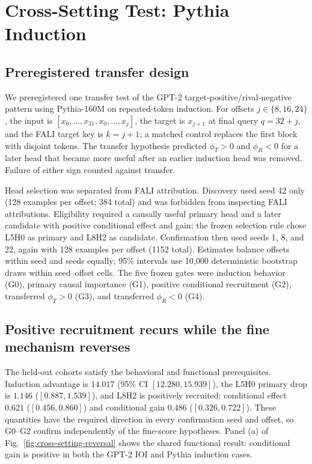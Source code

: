 \section{Cross-Setting Test: Pythia Induction}\label{sec:pythia}

\subsection{Preregistered transfer design}\label{sec:pythia-design}

We preregistered one transfer test of the GPT-2 target-positive/rival-negative pattern using Pythia-160M on repeated-token induction. For offsets $j\in\{8,16,24\}$, the input is $[x_0,\ldots,x_{31},x_0,\ldots,x_j]$, the target is $x_{j+1}$ at final query $q=32+j$, and the FALI target key is $k=j+1$; a matched control replaces the first block with disjoint tokens. The transfer hypothesis predicted $\phi_T>0$ and $\phi_R<0$ for a later head that became more useful after an earlier induction head was removed. Failure of either sign counted against transfer.

Head selection was separated from FALI attribution. Discovery used seed 42 only (128 examples per offset; 384 total) and was forbidden from inspecting FALI attributions. Eligibility required a causally useful primary head and a later candidate with positive conditional effect and gain; the frozen selection rule chose L5H0 as primary and L8H2 as candidate. Confirmation then used seeds 1, 8, and 22, again with 128 examples per offset (1152 total). Estimates balance offsets within seed and seeds equally; 95\% intervals use 10,000 deterministic bootstrap draws within seed--offset cells. The five frozen gates were induction behavior (G0), primary causal importance (G1), positive conditional recruitment (G2), transferred $\phi_T>0$ (G3), and transferred $\phi_R<0$ (G4).

\subsection{Positive recruitment recurs while the fine mechanism reverses}\label{sec:pythia-results}

The held-out cohorts satisfy the behavioral and functional prerequisites. Induction advantage is $14.017$ (95\% CI $[12.280,15.939]$), the L5H0 primary drop is $1.146$ ($[0.887,1.539]$), and L8H2 is positively recruited: conditional effect $0.621$ ($[0.456,0.860]$) and conditional gain $0.486$ ($[0.326,0.722]$). These quantities have the required direction in every confirmation seed and offset, so G0--G2 confirm independently of the fine-score hypotheses. Panel (a) of Fig.~\ref{fig:cross-setting-reversal} shows the shared functional result: conditional gain is positive in both the GPT-2 IOI and Pythia induction cases.

